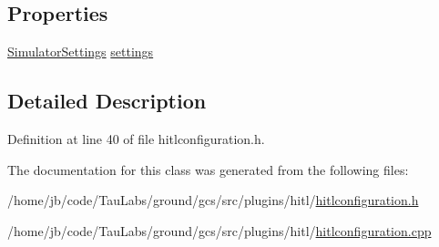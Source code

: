 \subsection*{\-Properties}
\begin{DoxyCompactItemize}
\item 
\hyperlink{group___h_i_t_l_plugin_ga052199f1328d3002bce3e45345aa7f4e}{\-Simulator\-Settings} \hyperlink{group___h_i_t_l_plugin_ga961f33f3db5f79daaf792a4999ac5c06}{settings}
\end{DoxyCompactItemize}


\subsection{\-Detailed \-Description}


\-Definition at line 40 of file hitlconfiguration.\-h.



\-The documentation for this class was generated from the following files\-:\begin{DoxyCompactItemize}
\item 
/home/jb/code/\-Tau\-Labs/ground/gcs/src/plugins/hitl/\hyperlink{hitlconfiguration_8h}{hitlconfiguration.\-h}\item 
/home/jb/code/\-Tau\-Labs/ground/gcs/src/plugins/hitl/\hyperlink{hitlconfiguration_8cpp}{hitlconfiguration.\-cpp}\end{DoxyCompactItemize}
